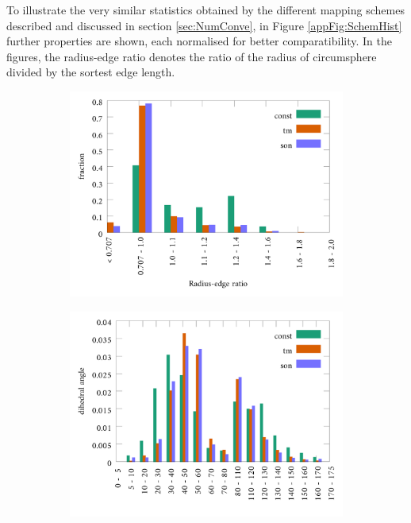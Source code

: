 To illustrate the very similar statistics obtained by the different mapping schemes described and discussed in section \ref{sec:NumConve}, in Figure \ref{appFig:SchemHist} further properties are shown, each normalised for better comparatibility.
In the figures, the radius-edge ratio denotes the ratio of the radius of circumsphere divided by the sortest edge length.
\begin{figure}
\begin{subfigure}{0.5\textwidth}
\includegraphics[width=\textwidth]{Figures/App/Rad_histAp1.pdf}
\end{subfigure}
\begin{subfigure}{0.5\textwidth}
\includegraphics[width=\textwidth]{Figures/App/Rad_histAp2.pdf}

\end{subfigure}
\end{figure}
